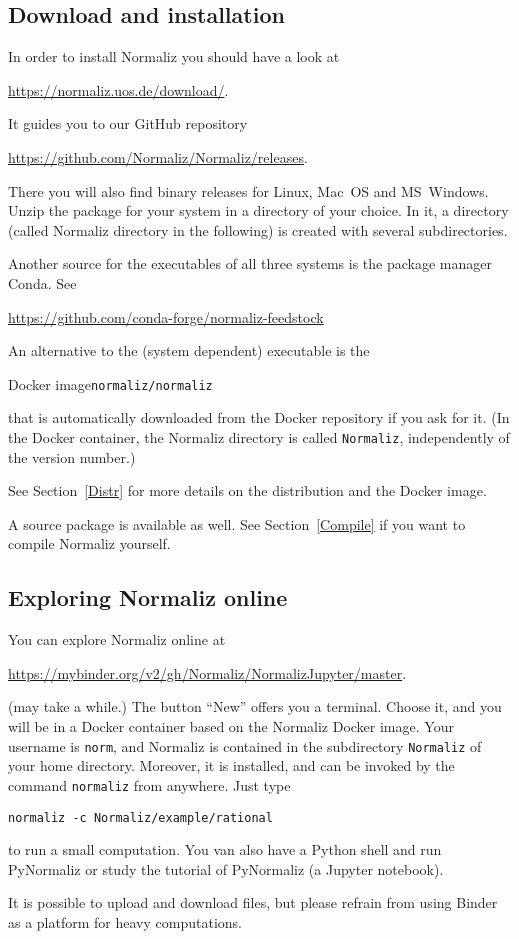 \subsection{Download and installation}

In order to install Normaliz you should have a look at
\begin{center}
	\url{https://normaliz.uos.de/download/}.
\end{center}
It guides you to our GitHub repository
\begin{center}
	\url{https://github.com/Normaliz/Normaliz/releases}.
\end{center}
There you will also find binary releases for Linux, Mac~OS and MS~Windows. Unzip the package for your system in a directory of your choice. In it, a
directory \ttt{\NmzDir} (called Normaliz directory in the
following) is created with several subdirectories.

Another source for the executables of all three systems is the package manager Conda. See
\begin{center}
	\url{https://github.com/conda-forge/normaliz-feedstock}
\end{center}


An alternative to the (system dependent) executable is the
\begin{center}
	Docker image\qquad \verb|normaliz/normaliz|
\end{center}
that is automatically downloaded from the Docker repository if you ask for it. (In the Docker container, the Normaliz directory is called \verb|Normaliz|, independently of the version number.)

See Section~\ref{Distr} for more details on the distribution and the Docker image.

A source package is available as well. See Section~\ref{Compile} if you want to compile Normaliz yourself.

\subsection{Exploring Normaliz online}

You can explore Normaliz online at
\begin{center}
	\url{https://mybinder.org/v2/gh/Normaliz/NormalizJupyter/master}.
\end{center}
(may take a while.) The button ``New'' offers you a terminal. Choose it, and you will be in a Docker container based on the Normaliz Docker image. Your username is \verb|norm|, and Normaliz is contained in the subdirectory \verb|Normaliz| of your home directory. Moreover, it is installed, and can be invoked by the command \verb|normaliz| from anywhere. Just type
\begin{Verbatim}
normaliz -c Normaliz/example/rational
\end{Verbatim}
to run a small computation. You van also have a Python shell and run PyNormaliz or study the tutorial of PyNormaliz (a Jupyter notebook).

It is possible to upload and download files, but please refrain from using Binder as a platform for heavy computations.

